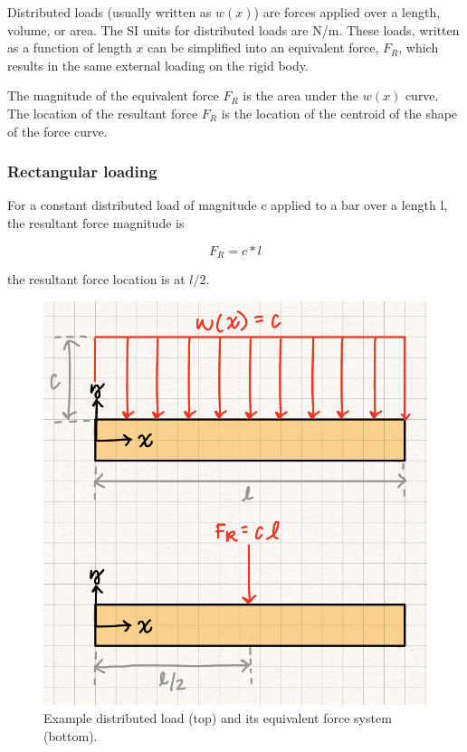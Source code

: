 Distributed loads (usually written as $w(x)$) are forces applied over a length, volume, or area. The SI units for distributed loads are N/m. These loads, written as a function of length $x$ can be simplified into an equivalent force, $F_R$, which results in the same external loading on the rigid body. 

The magnitude of the equivalent force $F_R$ is the area under the $w(x)$ curve. The location of the resultant force $F_R$ is the location of the centroid of the shape of the force curve. 


\subsubsection{Rectangular loading}

For a constant distributed load of magnitude c applied to a bar over a length l, the resultant force magnitude is 

\[F_R = c*l\]

the resultant force location is at $l/2$.

\begin{figure}[!h]
\centering
\includegraphics[angle=0, width=5 in]{ForceSystemsFigures/DistLoad.PNG}
\vspace{-2mm}
\caption{\small Example distributed load (top) and its equivalent force system (bottom).}
\vspace{-3mm}
\label{Fig:DistLoad}
\end{figure}


